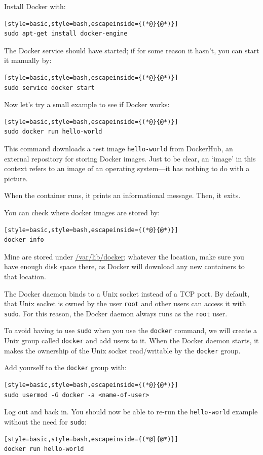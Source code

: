 \documentclass[12pt, a4paper, twoside, openany, titlepage]{book}
\begin{document}
Install Docker with:
\begin{lstlisting}[style=basic,style=bash,escapeinside={(*@}{@*)}]
sudo apt-get install docker-engine
\end{lstlisting}

The Docker service should have started; if for some reason it hasn't, you can start it manually by:
\begin{lstlisting}[style=basic,style=bash,escapeinside={(*@}{@*)}]
sudo service docker start
\end{lstlisting}

Now let's try a small example to see if Docker works:
\begin{lstlisting}[style=basic,style=bash,escapeinside={(*@}{@*)}]
sudo docker run hello-world
\end{lstlisting}

This command downloads a test image \texttt{hello-world} from DockerHub, an external repository for storing Docker images. Just to be clear, an `image' in this context refers to an image of an operating system---it has nothing to do with a picture.

When the container runs, it prints an informational message. Then, it exits.

You can check where docker images are stored by:
\begin{lstlisting}[style=basic,style=bash,escapeinside={(*@}{@*)}]
docker info
\end{lstlisting}
Mine are stored under \url{/var/lib/docker}; whatever the location, make sure you have enough disk space there, as Docker will download any new containers to that location.

The Docker daemon binds to a Unix socket instead of a TCP port. By default, that Unix socket is owned by the user \texttt{root} and other users can access it with \texttt{sudo}. For this reason, the Docker daemon always runs as the \texttt{root} user.

To avoid having to use \texttt{sudo} when you use the \texttt{docker} command, we will create a Unix group called \texttt{docker} and add users to it. When the Docker daemon starts, it makes the ownership of the Unix socket read/writable by the \texttt{docker} group.

Add yourself to the \texttt{docker} group with:
\begin{lstlisting}[style=basic,style=bash,escapeinside={(*@}{@*)}]
sudo usermod -G docker -a <name-of-user>
\end{lstlisting}
Log out and back in. You should now be able to re-run the \texttt{hello-world} example without the need for \texttt{sudo}:
\begin{lstlisting}[style=basic,style=bash,escapeinside={(*@}{@*)}]
docker run hello-world
\end{lstlisting}
\end{document}
